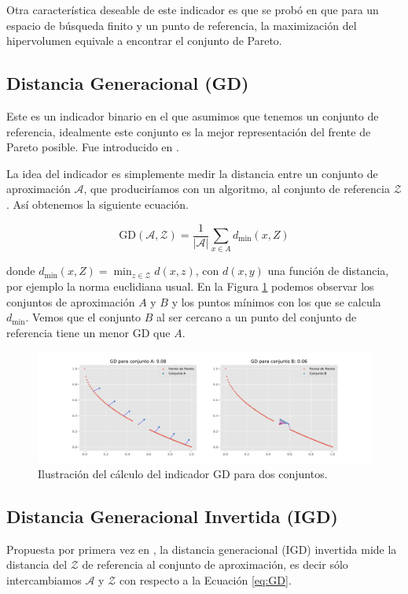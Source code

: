 Otra característica deseable de este indicador es que se probó en \cite{Measure_Pareto_Optima} que para un espacio de búsqueda finito y un punto de referencia, la maximización del hipervolumen equivale a encontrar el conjunto de Pareto. 

\subsection{Distancia Generacional (GD)} \label{sec:GD}
Este es un indicador binario en el que asumimos que tenemos un conjunto de referencia, idealmente este conjunto es la mejor representación del frente de Pareto posible. Fue introducido en \cite{GD}.

La idea del indicador es simplemente medir la distancia entre un conjunto de aproximación $\mathcal{A}$, que produciríamos con un algoritmo, al conjunto de referencia $\mathcal{Z}$. Así obtenemos la siguiente ecuación.

\begin{equation} \label{eq:GD}
    \text{GD} \left( \mathcal{A},\mathcal{Z} \right) = \frac{1}{|\mathcal{A}|} \sum_{x\in A} d_{\min}(x,Z)
\end{equation}

donde $d_{\min}(x,Z)=\min_{z \in \mathcal{Z}}{d(x,z)}$, con $d(x,y)$ una función de distancia, por ejemplo la norma euclidiana usual. En la Figura \ref{fig:GD_demo} podemos observar los conjuntos de aproximación $A$ y $B$ y los puntos mínimos con los que se calcula $d_{\min}$. Vemos que el conjunto $B$ al ser cercano a un punto del conjunto de referencia tiene un menor $\text{GD}$ que $A$.

\begin{figure}[H]
    \centering
    \includegraphics[width=\textwidth]{Figuras/GD_demo.pdf}
    \caption[GD]{Ilustración del cálculo del indicador GD para dos conjuntos.}
    \label{fig:GD_demo}
\end{figure}

\subsection{Distancia Generacional Invertida (IGD)} \label{sec:IGD}
Propuesta por primera vez en \cite{IGD}, la distancia generacional (IGD) invertida mide la distancia del $\mathcal{Z}$ de referencia al conjunto de aproximación, es decir sólo intercambiamos $\mathcal{A}$ y $\mathcal{Z}$ con respecto a la Ecuación \ref{eq:GD}.

